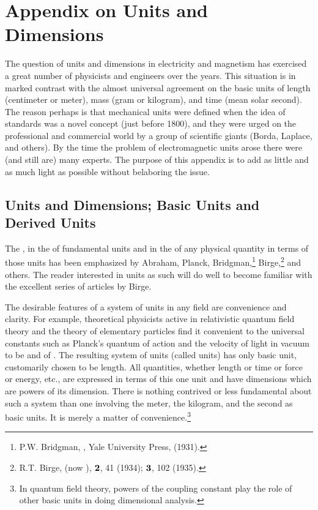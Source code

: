 \appendix
\chapter{Appendix on Units and Dimensions}
\renewcommand{\thechapter}{A}
\setcounter{equation}{0}	        %

The question of units and dimensions in electricity and magnetism has exercised a great number of physicists and engineers over the years. This situation is in marked contrast with the almost universal agreement on the basic units of length (centimeter or meter), mass (gram or kilogram), and time (mean solar second). The reason perhaps is that mechanical units were defined when the idea of  standards was a novel concept (just before 1800), and they were urged on the professional and commercial world by a group of scientific giants (Borda, Laplace, and others). By the time the problem of electromagnetic units arose there were (and still are) many experts. The purpose of this appendix is to add as little and as much light as possible without belaboring the issue.

\section{Units and Dimensions; Basic Units and\\ Derived Units}\label{sec:A.1}

The , in the  of fundamental units and in the  of any physical quantity in terms of those units has been emphasized by Abraham, Planck, Bridgman,\footnote[1]{P.W. Bridgman, , Yale University Press,  (1931).} Birge,\footnote[2]{R.T. Birge,  (now ), $\vb{2}$, 41 (1934); $\vb{3}$, 102 (1935).} and others. The reader interested in units as such will do well to become familiar with the excellent series of articles by Birge.

The desirable features of a system of units in any field are convenience and clarity. For example, theoretical physicists active in relativistic quantum field theory and the theory of elementary particles find it convenient to 
the universal constants such as Planck's quantum of action and the velocity of light in vacuum to be 
and of . The resulting system of units (called  units) has only  basic unit, customarily chosen to be length. All quantities, whether length or time or force or energy, etc., are expressed in terms of this one unit and have dimensions which are powers of its dimension. There is nothing contrived or less fundamental about such a system than one involving the meter, the kilogram, and the second as basic units. It is merely a matter of convenience.\footnote[3]{In quantum field theory, powers of the coupling constant play the role of other basic units in doing dimensional analysis.} 

